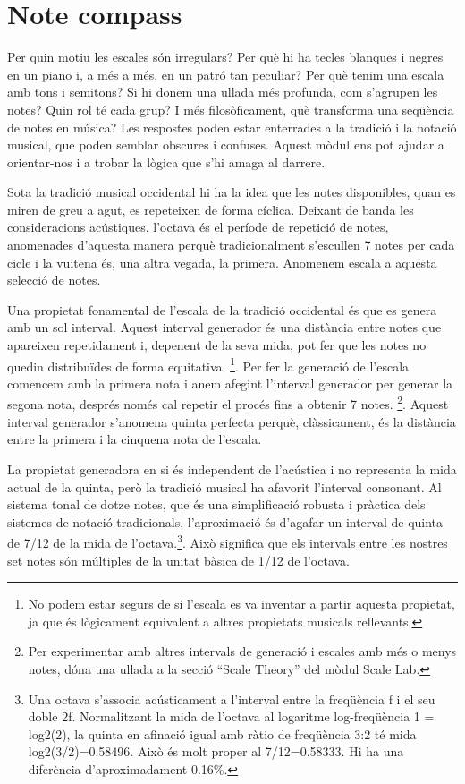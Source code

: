 \section{Note compass}
Per quin motiu les escales són irregulars? Per què hi ha tecles blanques i negres en un piano i, a més a més, en un patró tan peculiar? Per què tenim una escala amb tons i semitons? Si hi donem una ullada més profunda, com s'agrupen les notes? Quin rol té cada grup? I més filosòficament, què transforma una seqüència de notes en música? Les respostes poden estar enterrades a la tradició i la notació musical, que poden semblar obscures i confuses. Aquest mòdul ens pot ajudar a orientar-nos i a trobar la lògica que s'hi amaga al darrere.

Sota la tradició musical occidental hi ha la idea que les notes disponibles, quan es miren de greu a agut, es repeteixen de forma cíclica.  Deixant de banda les consideracions acústiques, l'octava és el període de repetició de notes, anomenades d'aquesta manera perquè tradicionalment s'escullen 7 notes per cada cicle i la vuitena és, una altra vegada, la primera. Anomenem escala a aquesta selecció  de notes.

Una propietat fonamental de l'escala de la tradició occidental és que es genera amb un sol interval. Aquest interval generador és una distància entre notes que apareixen repetidament i, depenent de la seva mida, pot fer que les notes no quedin distribuïdes de forma equitativa. \footnote{No podem estar segurs de si l'escala es va inventar a partir aquesta propietat, ja que és lògicament equivalent a altres propietats musicals rellevants.}. Per fer la generació de l'escala comencem amb la primera nota i anem afegint l'interval generador per generar la segona nota, després només cal repetir el procés fins a obtenir 7 notes.  \footnote{Per experimentar amb altres intervals de generació i escales amb més o menys notes, dóna una ullada a la secció ``Scale Theory'' del mòdul Scale Lab.}. Aquest interval generador s'anomena quinta perfecta perquè, clàssicament, és la distància entre la primera i la cinquena nota de l'escala.

La propietat generadora en si és independent de l'acústica i no representa la mida actual de la quinta, però la tradició musical ha afavorit l'interval consonant. Al sistema tonal de dotze notes, que és una simplificació robusta i pràctica dels sistemes de notació tradicionals, l'aproximació és d'agafar un interval de quinta de 7/12 de la mida de l'octava.\footnote{Una octava s'associa acústicament a l'interval entre la freqüència f i el seu doble 2f. Normalitzant la mida de l'octava al logaritme log-freqüència 1 = log2(2), la quinta en afinació igual amb ràtio de freqüència 3:2 té mida log2(3/2)=0.58496. Això és molt proper al 7/12=0.58333. Hi ha una diferència d'aproximadament 0.16\%.}. Això significa que els intervals entre les nostres set notes són múltiples de la unitat bàsica de 1/12 de l'octava.

